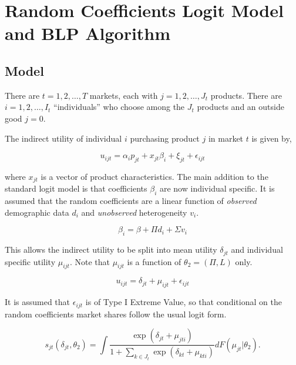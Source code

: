 \documentclass[parskip=half]{scrartcl}
\begin{document}
\section{Random Coefficients Logit Model and BLP Algorithm}

\subsection{Model}

There are \(t = 1, 2, \dotsc, T\) markets, each with \(j = 1, 2, \dotsc, J_t\) products. There are \(i = 1, 2, \dotsc, I_t\) ``individuals'' who choose among the \(J_t\) products and an outside good \(j = 0\).

The indirect utility of individual \(i\) purchasing product \(j\) in market \(t\) is given by,

\begin{equation}
u_{ijt} = \alpha_i p_{jt} + x_{jt} \beta_i + \xi_{jt} + \epsilon_{ijt}
\end{equation}

where \(x_{jt}\) is a vector of product characteristics. The main addition to the standard logit model is that coefficients \(\beta_i\) are now individual specific. It is assumed that the random coefficients are a linear function of \emph{observed} demographic data \(d_i\) and \emph{unobserved} heterogeneity \(v_i\).

\begin{equation}
\beta_i = \beta + \Pi d_i + \Sigma v_i
\end{equation}

This allows the indirect utility to be split into mean utility \(\delta_{jt}\) and individual specific utility \(\mu_{ijt}\). Note that \(\mu_{ijt}\) is a function of \(\theta_2 = (\Pi, L)\) only.

\begin{equation}
u_{ijt} = \delta_{jt} + \mu_{ijt} + \epsilon_{ijt}
\end{equation}

It is assumed that \(\epsilon_{ijt}\) is of Type I Extreme Value, so that conditional on the random coefficients market shares follow the usual logit form.

\begin{equation}
\label{eq:market_share_integral}
s_{jt}(\delta_{jt}, \theta_2) = \int \frac{\exp(\delta_{jt} + \mu_{jti})}{1 + \sum_{k \in J_t} \exp(\delta_{kt} + \mu_{kti})} dF(\mu_{jt} | \theta_2).
\end{equation}
\end{document}
